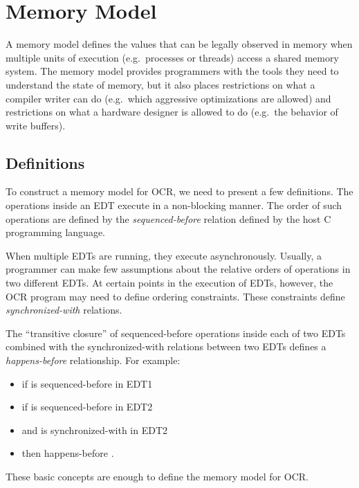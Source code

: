 %
%

%
%
%
%
\section{Memory Model}
\label{sec:MemoryModel}
A memory model defines the values that can be legally observed in
memory when multiple units of execution (e.g.\ processes or threads)
access a shared memory system. The memory model provides programmers
with the tools they need to understand the state of memory, but it
also places restrictions on what a compiler writer can do (e.g.\ which
aggressive optimizations are allowed) and restrictions on what a
hardware designer is allowed to do (e.g.\ the behavior of write
buffers).
\subsection{Definitions}
To construct a memory model for OCR, we need to present a few
definitions. The operations inside an EDT execute in a non-blocking
manner. The order of such operations are defined by the
\emph{sequenced-before} relation defined by
the host C programming language.

When multiple EDTs are running, they execute asynchronously. Usually,
a programmer can make few assumptions about the relative orders of
operations in two different EDTs. At certain points in the execution
of EDTs, however, the OCR program may need to define ordering
constraints. These constraints define
\emph{synchronized-with} relations.

The ``transitive closure'' of sequenced-before operations inside each
of two EDTs combined with the synchronized-with relations between two
EDTs defines a \emph{happens-before}
relationship. For example:
\begin{itemize}
\item if  is sequenced-before  in EDT1
\item if  is sequenced-before  in EDT2
\item and  is synchronized-with  in EDT2
\item then  happens-before .
\end{itemize}
These basic concepts are enough to define the memory model for OCR.

